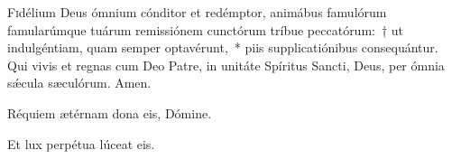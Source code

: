 \documentclass[vesperale_romanum]{subfiles}
\begin{document}
\lettrine{F}{i}délium Deus ó\-mnium cónditor et redémptor, animábus famulórum famularúmque tuárum remissiónem cunctórum tríbue peccatórum:~† ut indulgéntiam, quam semper optavérunt,~* piis supplicatiónibus consequántur. Qui vivis et regnas cum Deo Patre, in unitáte Spíritus Sancti, Deus, per ómnia sǽcula sæculórum.
\rr Amen.

\label{vv_requiem_etc}

\vv Réquiem ætérnam dona eis, Dómine.

\rr Et lux perpétua lúceat eis.


\end{document}
